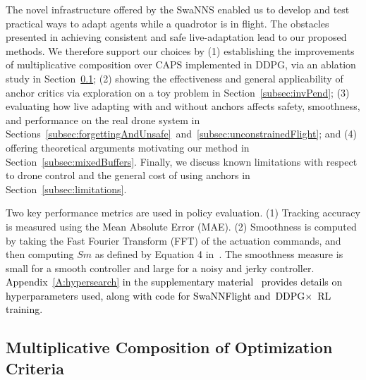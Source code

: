\documentclass[letterpaper, 10 pt, conference]{ieeeconf} %
\newcommand{\DDPGx}{$\text{DDPG}\times$}
\newcommand{\firmware}{SwaNNFlight}
\newcommand{\framework}{SwaNNS}
\newcommand{\rev}[1]{\textcolor{black}{#1}}
\begin{document}
    The novel infrastructure offered by the \framework{} enabled us to develop and test practical ways to adapt agents while a quadrotor is in flight. 
    The obstacles presented in achieving consistent and safe live-adaptation lead to our proposed methods.
    We therefore support our choices by (1) establishing the improvements of multiplicative composition over CAPS implemented in DDPG, via an ablation study in Section~\ref{eval:mult_v_lin}; (2) showing the effectiveness and general applicability of anchor critics via exploration on a toy problem in Section~\ref{subsec:invPend}; (3) evaluating how live adapting with and without anchors affects safety, smoothness, and performance on the real drone system in Sections~\ref{subsec:forgettingAndUnsafe}~and~\ref{subsec:unconstrainedFlight}; and (4) offering theoretical arguments motivating our method in Section~\ref{subsec:mixedBuffers}. Finally, we discuss known limitations with respect to drone control and the general cost of using anchors in Section~\ref{subsec:limitations}.
    
    Two key performance metrics are used in policy evaluation. 
    (1) Tracking accuracy is measured using the Mean Absolute Error (MAE). 
    (2) Smoothness is computed by taking the Fast Fourier Transform (FFT) of the actuation commands, and then computing $Sm$ as defined by Equation 4 in~\cite{mysore2021caps}.
    The smoothness measure is small for a smooth controller and large for a noisy and jerky controller.
    \rev{Appendix~\ref{A:hypersearch} in the supplementary material~\cite{supplementary} provides details on hyperparameters used, along with code for \firmware{} and \DDPGx{} RL training.}

    
    \subsection{Multiplicative Composition of Optimization Criteria}\label{eval:mult_v_lin}
\end{document}
